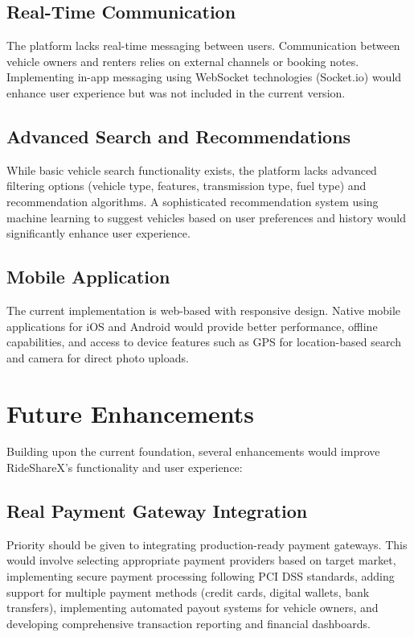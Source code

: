 \documentclass[12pt,a4paper]{report}
\begin{document}
	\subsection{Real-Time Communication}
	
	The platform lacks real-time messaging between users. Communication between vehicle owners and renters relies on external channels or booking notes. Implementing in-app messaging using WebSocket technologies (Socket.io) would enhance user experience but was not included in the current version.
	
	\subsection{Advanced Search and Recommendations}
	
	While basic vehicle search functionality exists, the platform lacks advanced filtering options (vehicle type, features, transmission type, fuel type) and recommendation algorithms. A sophisticated recommendation system using machine learning to suggest vehicles based on user preferences and history would significantly enhance user experience.
	
	\subsection{Mobile Application}
	
	The current implementation is web-based with responsive design. Native mobile applications for iOS and Android would provide better performance, offline capabilities, and access to device features such as GPS for location-based search and camera for direct photo uploads.
	
	\section{Future Enhancements}
	
	Building upon the current foundation, several enhancements would improve RideShareX's functionality and user experience:
	
	\subsection{Real Payment Gateway Integration}
	
	Priority should be given to integrating production-ready payment gateways. This would involve selecting appropriate payment providers based on target market, implementing secure payment processing following PCI DSS standards, adding support for multiple payment methods (credit cards, digital wallets, bank transfers), implementing automated payout systems for vehicle owners, and developing comprehensive transaction reporting and financial dashboards.
	
\end{document}
